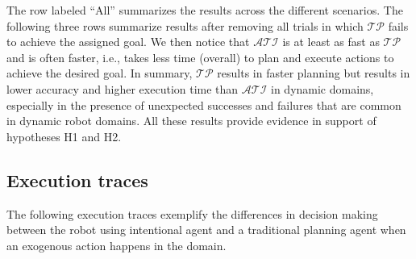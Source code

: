 \documentclass[letterpaper, 10 pt, conference]{article}  %
\begin{document}
The row labeled ``All'' summarizes the results across the different
scenarios.  The following three rows summarize results after removing
all trials in which $\mathcal{TP}$ fails to achieve the assigned goal.
We then notice that $\mathcal{ATI}$ is at least as fast as
$\mathcal{TP}$ and is often faster, i.e., takes less time (overall) to
plan and execute actions to achieve the desired goal. In summary,
$\mathcal{TP}$ results in faster planning but results in lower
accuracy and higher execution time than $\mathcal{ATI}$ in dynamic
domains, especially in the presence of unexpected successes and
failures that are common in dynamic robot domains. All these results
provide evidence in support of hypotheses H1 and H2.





\subsection{Execution traces}
\label{sec:expres-traces}
The following execution traces exemplify the differences in decision
making between the robot using  intentional agent and a traditional planning
agent when an exogenous action happens in the domain.
\end{document}
